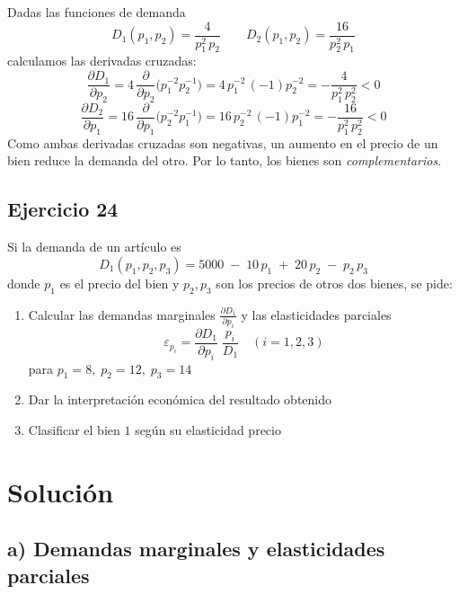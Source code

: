 \documentclass{article}
\begin{document}
Dadas las funciones de demanda
\[
D_1(p_1,p_2)=\frac{4}{p_1^2\,p_2}
\qquad
D_2(p_1,p_2)=\frac{16}{p_2^2\,p_1}
\]
calculamos las derivadas cruzadas:
\[
\frac{\partial D_1}{\partial p_2}
=4\,\frac{\partial}{\partial p_2}\bigl(p_1^{-2}p_2^{-1}\bigr)
=4\,p_1^{-2}\,(-1)p_2^{-2}
=-\frac{4}{p_1^2\,p_2^2}<0
\]
\[
\frac{\partial D_2}{\partial p_1}
=16\,\frac{\partial}{\partial p_1}\bigl(p_2^{-2}p_1^{-1}\bigr)
=16\,p_2^{-2}\,(-1)p_1^{-2}
=-\frac{16}{p_1^2\,p_2^2}<0
\]
Como ambas derivadas cruzadas son negativas, un aumento en el precio de un bien reduce la demanda del otro. {\color{teal}Por lo tanto, los bienes son \emph{complementarios}}.


\newpage
\subsection{Ejercicio 24}

Si la demanda de un artículo es
\[
D_{1}(p_{1},p_{2},p_{3}) = 5000 \;-\; 10\,p_{1} \;+\; 20\,p_{2} \;-\; p_{2}\,p_{3}
\]
donde \(p_{1}\) es el precio del bien y \(p_{2},p_{3}\) son los precios de otros dos bienes, se pide:

\begin{enumerate}
  \item Calcular las demandas marginales \(\displaystyle \frac{\partial D_{1}}{\partial p_{i}}\) y las elasticidades parciales
  \[
    \varepsilon_{p_{i}}
    = \frac{\partial D_{1}}{\partial p_{i}}\;\frac{p_{i}}{D_{1}}
    \quad (i=1,2,3)
  \]
  para \(p_{1}=8,\;p_{2}=12,\;p_{3}=14\)
  \item Dar la interpretación económica del resultado obtenido
  \item Clasificar el bien \(1\) según su elasticidad precio
\end{enumerate}

\newpage
\section*{Solución}

\subsection*{a) Demandas marginales y elasticidades parciales}
\end{document}
